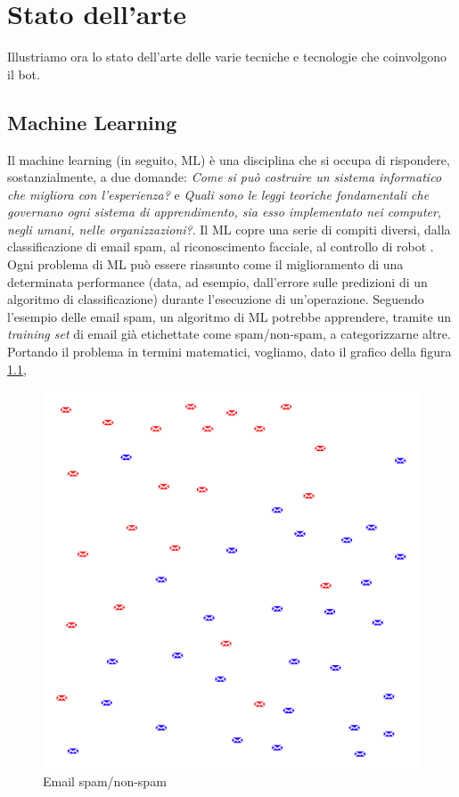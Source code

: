 \chapter{Stato dell'arte}
\label{chap:stateofart}
Illustriamo ora lo stato dell'arte delle varie tecniche e tecnologie che coinvolgono il bot.
\section{Machine Learning}
Il machine learning (in seguito, ML) è una disciplina che si occupa di rispondere, sostanzialmente, a due domande: \textit{Come si può costruire un sistema informatico che migliora con l'esperienza?} e \textit{Quali sono le leggi teoriche fondamentali che governano ogni sistema di apprendimento, sia esso implementato nei computer, negli umani, nelle organizzazioni?}. Il ML copre una serie di compiti diversi, dalla classificazione di email spam, al riconoscimento facciale, al controllo di robot \cite{book:mitchell1997machine}. Ogni problema di ML può essere riassunto come il miglioramento di una determinata performance (data, ad esempio, dall'errore sulle predizioni di un algoritmo di classificazione) durante l'esecuzione di un'operazione. Seguendo l'esempio delle email spam, un algoritmo di ML potrebbe apprendere, tramite un \textit{training set} di email già etichettate come spam/non-spam, a categorizzarne altre.
Portando il problema in termini matematici, vogliamo, dato il grafico della figura \ref{fig:noncategorized-spam},
\begin{figure}[H]
    \begin{center}
        \includegraphics[width=0.8\columnwidth]{images/stateofart/noncategorized-spam.png}
    \end{center}
    \caption{Email spam/non-spam}
    \label{fig:noncategorized-spam}
\end{figure}
